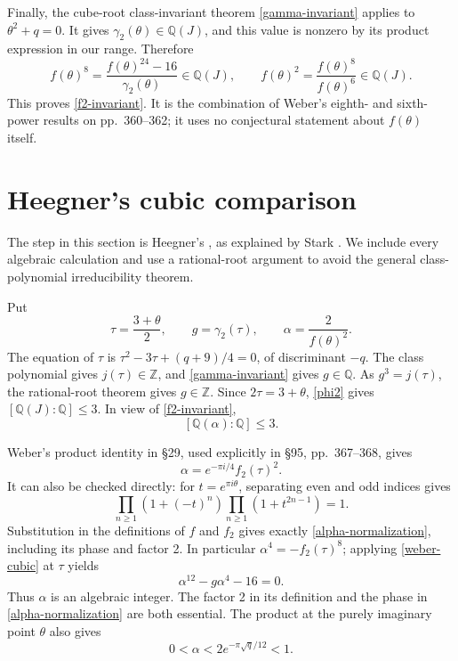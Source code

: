 \documentclass[11pt]{article}
\newcommand{\Z}{\mathbb Z}
\newcommand{\Q}{\mathbb Q}
\begin{document}
Finally, the cube-root class-invariant theorem
\eqref{gamma-invariant} applies to \(\theta^2+q=0\).
It gives \(\gamma_2(\theta)\in\Q(J)\), and this value is nonzero
by its product expression in our range. Therefore
\[
 f(\theta)^8=\frac{f(\theta)^{24}-16}{\gamma_2(\theta)}\in\Q(J),
 \qquad
 f(\theta)^2=\frac{f(\theta)^8}{f(\theta)^6}\in\Q(J).
\]
This proves \eqref{f2-invariant}. It is the combination of Weber's
eighth- and sixth-power results on pp.~360--362; it uses no conjectural
statement about \(f(\theta)\) itself.

\section{Heegner's cubic comparison}\label{comparison}

The step in this section is Heegner's \cite{heegner}, as explained by
Stark \cite[\S2]{stark}. We include every algebraic calculation and use
a rational-root argument to avoid the general class-polynomial
irreducibility theorem.

Put
\[
 \tau=\frac{3+\theta}{2},\qquad
 g=\gamma_2(\tau),\qquad \alpha=\frac{2}{f(\theta)^2}.
\]
The equation of \(\tau\) is
\(\tau^2-3\tau+(q+9)/4=0\), of discriminant \(-q\).
The class polynomial gives \(j(\tau)\in\Z\), and
\eqref{gamma-invariant} gives \(g\in\Q\). As
\(g^3=j(\tau)\), the rational-root theorem gives \(g\in\Z\).
Since \(2\tau=3+\theta\), \eqref{phi2} gives
\([\Q(J):\Q]\le3\). In view of \eqref{f2-invariant},
\begin{equation}\label{degree-upper}
 [\Q(\alpha):\Q]\le3.
\end{equation}

Weber's product identity in \S29, used explicitly in \S95,
pp.~367--368, gives
\begin{equation}\label{alpha-normalization}
 \alpha=e^{-\pi i/4} f_2(\tau)^2.
\end{equation}
It can also be checked directly: for \(t=e^{\pi i\theta}\), separating
even and odd indices gives
\[
 \prod_{n\ge1}(1+(-t)^n)\prod_{n\ge1}(1+t^{2n-1})=1.
\]
Substitution in the definitions of \(f\) and \(f_2\) gives exactly
\eqref{alpha-normalization}, including its phase and factor 2.
In particular \(\alpha^4=-f_2(\tau)^8\); applying
\eqref{weber-cubic} at \(\tau\) yields
\begin{equation}\label{degree12}
 \alpha^{12}-g\alpha^4-16=0.
\end{equation}
Thus \(\alpha\) is an algebraic integer. The factor 2 in its
definition and the phase in \eqref{alpha-normalization} are both
essential. The product at the purely imaginary point \(\theta\)
also gives
\begin{equation}\label{alpha-small}
 0<\alpha<2e^{-\pi\sqrt q/12}<1.
\end{equation}
\end{document}
